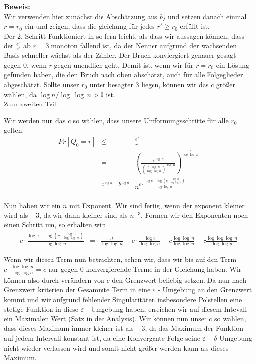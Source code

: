 \documentclass[11pt,a4paper,ngerman]{article}
\begin{document}
\begin{enumerate}[\bfseries a)]
\textbf{Beweis:}\\
Wir verwenden hier zunächst die Abschätzung aus \emph{b)} und setzen danach einmal $r = r_0$ ein und zeigen, dass die gleichung für jedes $r' \geq r_0$ erfüllt ist.\\

Der 2. Schritt Funktioniert in so fern leicht, als dass wir aussagen können, dass der $\frac{e^r}{r^r}$ ab $r = 3$ monoton fallend ist, da der Nenner aufgrund der wachsenden Basis schneller wächst als der Zähler. Der Bruch konviergiert genauer gesagt gegen 0, wenn $r$ gegen unendlich geht. Demit ist, wenn wir für $r=r_0$ ein Lösung gefunden haben, die den Bruch nach oben abschätzt, auch für alle Folgeglieder abgeschätzt. Sollte unser $r_0$ unter besagter 3 liegen, können wir das $c$ größer wählen, da $\log n / \log \, \log \, n > 0$ ist.\\

Zum zweiten Teil:

Wir werden nun das $c$ so wählen, dass unsere Umformungsschritte für alle $r_0$ gelten.\\

$$
\begin{array}{rcl}
Pr[Q_0 = r] &\leq&\frac{e^r}{r^r}\\
& = & \left( \frac{e^{ \log \, n }}{ \left( \frac{c \cdot \log \, n}{\log \log \, n} \right)^{\log \, n} }  \right)^{\frac{c}{\log \log \; n}}\\
& \stackrel{a^{\log b} = b ^{\log a}}{=} & n^{c \cdot \frac{\log e - \log (c \cdot \frac{\log \, n}{\log \log \, n})}{\log \log \, n}}\\
\end{array}
$$

Nun haben wir ein $n$ mit Exponent. Wir sind fertig, wenn der exponent kleiner wird als $-3$, da wir dann kleiner sind als $n^{-3}$. Formen wir den Exponenten noch einen Schritt um, so erhalten wir:
$$
\begin{array}{rcl}
c \cdot \frac{\log e - \log (c \cdot \frac{\log \, n}{\log \log \, n})}{\log \log \, n} &=& \frac{d}{\log \log \, n} - c \cdot \frac{\log c}{\log \log n} - c \frac{\log \log \, n}{\log \log \, n} + c \frac{\log \log \log \, n}{\log \log n}
\end{array}
$$

Wenn wir diesen Term nun betrachten, sehen wir, dass wir bis auf den Term $c \cdot \frac{\log \log \, n}{\log \log n} = c$ nur gegen $0$ konvergierende Terme in der Gleichung haben. Wir können also durch verändern von $c$ den Grenzwert beliebig setzen. Da nun nach Grenzwert kriterien der Gesammte Term in eine $\varepsilon$ - Umgebung an den Grenzwert kommt und wir aufgrund fehlender Singularitäten insbesondere Polstellen eine stetige Funktion in diese $\varepsilon$ - Umgebung haben, erreichen wir auf diesem Intevall ein Maximalen Wert (Satz in der Analysis). Wir können nun unser c so wählen, dass dieses Maximum immer kleiner ist als $-3$, da das Maximum der Funktion auf jedem Intervall konstant ist, da eine Konvergente Folge seine $\varepsilon - \delta$ Umgebung nicht wieder verlassen wird und somit nicht größer werden kann als dieses Maximum.


\end{enumerate}
\end{document}
